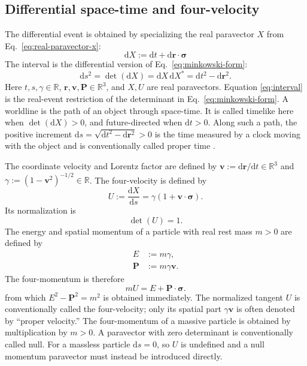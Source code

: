 \documentclass[10pt,letterpaper]{article}
\newcommand{\eqfunc}[1]{\operatorname{#1}}
\newcommand{\R}{\mathbb{R}}
\newcommand{\pv}[1]{#1}
\newcommand{\vct}[1]{\mathbf{#1}}
\newcommand{\sigv}{\vct{\pv{\bm{\sigma}}}}
\newcommand{\conj}[1]{#1^{*}}
\newcommand{\detf}[1]{\eqfunc{det}\!\left(#1\right)}
\newcommand{\dd}{\mathrm d}
\begin{document}
\subsection{Differential space-time and four-velocity}
The differential event is obtained by specializing the real paravector
\(\pv{X}\) from Eq.\ \eqref{eq:real-paravector-x}:
\begin{equation}
\dd\pv{X}:=\dd t+\dd\vct{r}\cdot\sigv
\label{eq:dX}
\end{equation}
The interval is the differential version of Eq.\ \eqref{eq:minkowski-form}:
\begin{equation}
\dd s^2=\detf{\dd\pv{X}}
=\dd\pv{X}\,\conj{\dd\pv{X}}
=\dd t^2-\dd\vct{r}^2.
\label{eq:interval}
\end{equation}
Here \(t,s,\gamma\in\R\), \(\vct{r},\vct{v},\vct{P}\in\R^3\), and
\(\pv{X},\pv{U}\) are real paravectors. Equation \eqref{eq:interval} is the
real-event restriction of the determinant in Eq.\
\eqref{eq:minkowski-form}. A worldline is the path of an object through
space-time. It is called timelike here when
\(\detf{\dd\pv{X}}>0\), and future-directed when \(\dd t>0\). Along such a
path, the positive increment
\(\dd s=\sqrt{\dd t^2-\dd\vct{r}^2}>0\) is the time measured by a clock
moving with the object and is conventionally called proper time
\cite{einstein1905,minkowski1908}.

The coordinate velocity and Lorentz factor are defined by
\(\vct{v}:=\dd\vct{r}/\dd t\in\R^3\) and
\(\gamma:=(1-\vct{v}^2)^{-1/2}\in\R\). The four-velocity is defined by
\begin{equation}
\pv{U}:=\frac{\dd\pv{X}}{\dd s}
=\gamma(1+\vct{v}\cdot\sigv).
\label{eq:proper-velocity}
\end{equation}
Its normalization is
\begin{equation}
\detf{\pv{U}}=1.
\label{eq:proper-velocity-normalization}
\end{equation}
The energy and spatial momentum of a particle with real rest mass \(m>0\)
are defined by
\begin{align}
E&:=m\gamma,
\label{eq:particle-energy}\\
\vct{P}&:=m\gamma\vct{v}.
\label{eq:particle-momentum}
\end{align}
The four-momentum is therefore
\begin{equation}
m\pv{U}=E+\vct{P}\cdot\sigv.
\label{eq:proper-momentum}
\end{equation}
from which $E^2-\vct{P}^2=m^2$ is obtained immediately.
The normalized tangent \(\pv{U}\) is conventionally called the
four-velocity; only its spatial part \(\gamma\vct{v}\) is often denoted by
``proper velocity.'' The four-momentum of a massive particle is obtained by
multiplication by \(m>0\). A paravector with zero determinant is
conventionally called null. For a massless particle \(\dd s=0\), so
\(\pv{U}\) is undefined and a null momentum paravector must instead be
introduced directly.
\end{document}
